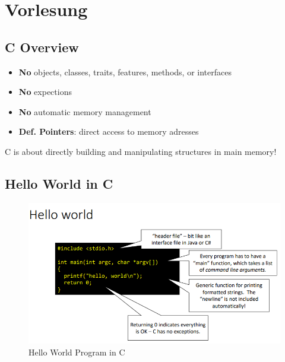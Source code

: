 \documentclass[a4paper,10pt]{article}
\begin{document}
\section{Vorlesung}
\subsection{C Overview}
\begin{itemize}
    \item \textbf{No} objects, classes, traits, features, methods, or interfaces
    \item \textbf{No} expections
    \item \textbf{No} automatic memory management
    \item \textbf{Def. Pointers}: direct access to memory adresses
\end{itemize}
C is about directly building and manipulating structures in main
memory!\\ 
\subsection{Hello World in C}
\begin{figure}[htp]
    \centering
    \includegraphics[width=1\linewidth]{e3.png}
    \caption{Hello World Program in C}
\end{figure}
\end{document}
